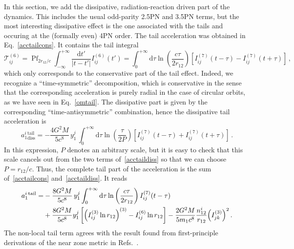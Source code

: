 \documentclass[prd,preprint,superscriptaddress,tightenlines,nofootinbib,
  eqsecnum,showpacs]{revtex4}
\newcommand{\ud}{\mathrm{d}}
\begin{document}
In this section, we add the dissipative, radiation-reaction driven part of the
dynamics. This includes the usual odd-parity 2.5PN and 3.5PN terms, but the
most interesting dissipative effect is the one associated with the tails and
occuring at the (formally even) 4PN order. The tail acceleration was obtained
in Eq.~\eqref{acctailcons}. It contains the tail integral
%
\begin{equation}\label{tailfactor6}
\mathcal{T}_{ij}^{(6)} = \mathop{\text{Pf}}_{2r_{12}/c}
\int_{-\infty}^{+\infty} \frac{\ud t'}{\vert t-t'\vert}
I_{ij}^{(6)}(t') = \int_0^{+\infty} \ud\tau
\ln\left(\frac{c\tau}{2r_{12}}\right)\left[I_{ij}^{(7)}(t-\tau) -
  I_{ij}^{(7)}(t+\tau)\right]\,,
\end{equation}
% 
which only corresponds to the conservative part of the tail effect. Indeed, we
recognize a ``time-symmetric'' decomposition, which is
conservative in the sense that the corresponding acceleration is purely radial
in the case of circular orbits, as we have seen in Eq.~\eqref{omtail}. The
dissipative part is given by the corresponding ``time-antisymmetric''
combination, hence the dissipative tail acceleration is
%
\begin{equation}\label{acctaildiss}
a_1^i{}_\text{diss}^\text{tail} = -\frac{4G^2M}{5c^8} \,y_1^j
  \,\int_0^{+\infty} \ud\tau
  \ln\left(\frac{\tau}{2P}\right)\left[I_{ij}^{(7)}(t-\tau) +
    I_{ij}^{(7)}(t+\tau)\right]\,.
\end{equation}
%
In this expression, $P$ denotes an arbitrary scale, but it is easy to check
that this scale cancels out from the two terms of~\eqref{acctaildiss} so that we
can choose $P=r_{12}/c$. Thus, the complete tail part of the acceleration is
the sum of~\eqref{acctailcons} and~\eqref{acctaildiss}. It reads
%
\begin{align}\label{acctail}
a_1^i{}^\text{tail} =& -\frac{8G^2M}{5c^8} \,y_1^j \int_0^{+\infty}
  \ud\tau \ln\left(\frac{c\tau}{2r_{12}}\right) I_{ij}^{(7)}(t-\tau)
  \nonumber\\ & +\frac{8G^2M}{5c^8} y_1^j\left[\left(I_{ij}^{(3)}\ln
    r_{12}\right)^{(3)}-I_{ij}^{(6)}\ln r_{12}\right]
  -\frac{2G^2M}{5m_1c^8}
  \frac{n_{12}^i}{r_{12}}\Bigl(I_{jk}^{(3)}\Bigr)^2\,.
\end{align}
%
The non-local tail term agrees with the result found from first-principle
derivations of the near zone metric in Refs.~\cite{BD88, B93, B97}.
\end{document}
